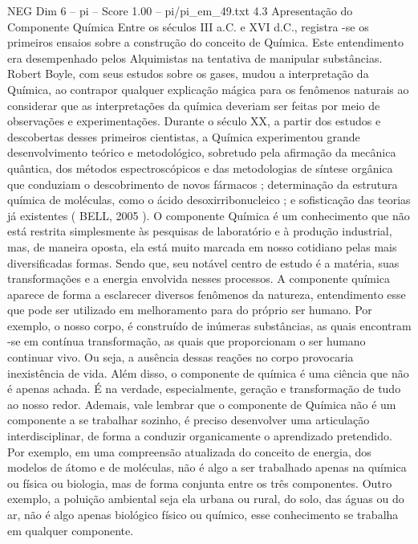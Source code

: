 \begin{textsample}{NEG Dim 6 – pi – Score 1.00 – pi/pi\_em\_49.txt}  \label{ex:f6_neg_093}
4.3 Apresentação do Componente Química Entre os séculos III a.C. e XVI d.C., registra -se os primeiros ensaios sobre a construção do conceito de Química.
Este entendimento era desempenhado pelos Alquimistas na tentativa de manipular substâncias.
Robert Boyle, com seus estudos sobre os gases, mudou a interpretação da Química, ao contrapor qualquer explicação mágica para os fenômenos naturais ao considerar que as interpretações da química deveriam ser feitas por meio de observações e experimentações.
Durante o século XX, a partir dos estudos e descobertas desses primeiros cientistas, a Química experimentou grande desenvolvimento teórico e metodológico, sobretudo pela afirmação da mecânica quântica, dos métodos espectroscópicos e das metodologias de síntese orgânica que conduziam o descobrimento de novos fármacos ; determinação da estrutura química de moléculas, como o ácido desoxirribonucleico ; e sofisticação das teorias já existentes ( BELL, 2005 ).
O componente Química é um conhecimento que não está restrita simplesmente às pesquisas de laboratório e à produção industrial, mas, de maneira oposta, ela está muito marcada em nosso cotidiano pelas mais diversificadas formas.
Sendo que, seu notável centro de estudo é a matéria, suas transformações e a energia envolvida nesses processos.
A componente química aparece de forma a esclarecer diversos fenômenos da natureza, entendimento esse que pode ser utilizado em melhoramento para do próprio ser humano.
Por exemplo, o nosso corpo, é construído de inúmeras substâncias, as quais encontram -se em contínua transformação, as quais que proporcionam o ser humano continuar vivo.
Ou seja, a ausência dessas reações no corpo provocaria inexistência de vida.
Além disso, o componente de química é uma ciência que não é apenas achada.
É na verdade, especialmente, geração e transformação de tudo ao nosso redor.
Ademais, vale lembrar que o componente de Química não é um componente a se trabalhar sozinho, é preciso desenvolver uma articulação interdisciplinar, de forma a conduzir organicamente o aprendizado pretendido.
Por exemplo, em uma compreensão atualizada do conceito de energia, dos modelos de átomo e de moléculas, não é algo a ser trabalhado apenas na química ou física ou biologia, mas de forma conjunta entre os três componentes.
Outro exemplo, a poluição ambiental seja ela urbana ou rural, do solo, das águas ou do ar, não é algo apenas biológico físico ou químico, esse conhecimento se trabalha em qualquer componente.

\end{textsample}
